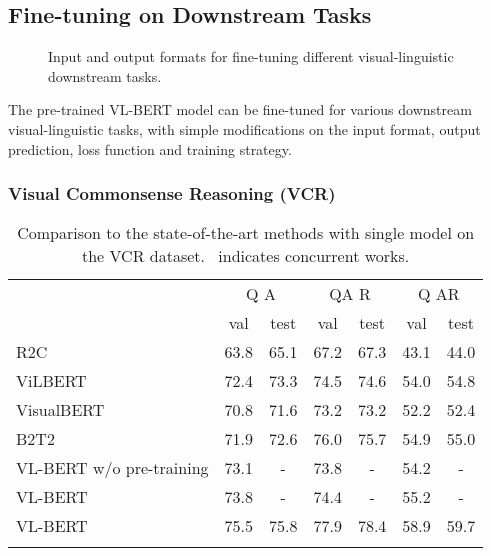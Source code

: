 \documentclass{article} \usepackage{iclr2020_conference,times}
\begin{document}
\subsection{Fine-tuning on Downstream Tasks}\label{sec:exp_finetune}

\begin{figure*}[ht]
\centering 
{}
\vspace{-0.5em}
\caption{Input and output formats for fine-tuning different visual-linguistic downstream tasks.}
\label{fig:finetune_paradigm}
\end{figure*}

The pre-trained VL-BERT model can be fine-tuned for various downstream visual-linguistic tasks, with simple modifications on the input format, output prediction, loss function and training strategy.

\subsubsection{Visual Commonsense Reasoning (VCR)}

\begin{table}[ht]
\small
    \centering
\begin{tabular}{l|cccccc}
\Xhline{1.0pt}
    \multirow{2}{*}{Model} & \multicolumn{2}{c}{Q  A} & \multicolumn{2}{c}{QA  R} & \multicolumn{2}{c}{Q  AR}\\
     & val & test & val & test & val & test\\
\hline
    R2C~\citep{zellers2019vcr} & 63.8 & 65.1 & 67.2 & 67.3 & 43.1 & 44.0 \\
\hline
    ViLBERT~\citep{lu2019vilbert}  & 72.4 & 73.3 & 74.5 & 74.6 & 54.0 & 54.8 \\
    VisualBERT~\citep{li2019visualbert}   & 70.8 & 71.6 & 73.2 & 73.2 & 52.2 & 52.4\\ 
    B2T2~\citep{alberti2019fusion}   & 71.9 & 72.6 & 76.0 & 75.7 & 54.9 & 55.0 \\
\hline
    VL-BERT w/o pre-training  & 73.1 & - & 73.8  & - & 54.2 & - \\
    VL-BERT  & 73.8 & - & 74.4 & - & 55.2 & - \\
    VL-BERT  & 75.5 & 75.8 & 77.9  & 78.4 & 58.9 & 59.7 \\
\Xhline{1.0pt}
\end{tabular}
\caption{Comparison to the state-of-the-art methods with single model on the VCR dataset. \newline \dag ~indicates concurrent works.}
\label{table:results_VCR}
\end{table}
\end{document}
